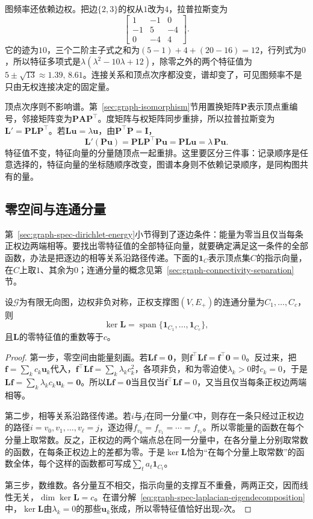 图频率还依赖边权。把边$\{2,3\}$的权从$1$改为$4$，拉普拉斯变为
\[
 \begin{bmatrix}1&-1&0\\-1&5&-4\\0&-4&4\end{bmatrix}.
\]
它的迹为$10$，三个二阶主子式之和为$(5-1)+4+(20-16)=12$，行列式为$0$，所以特征多项式是$\lambda(\lambda^2-10\lambda+12)$，除零之外的两个特征值为$5\pm\sqrt{13}\approx1.39,\,8.61$。连接关系和顶点次序都没变，谱却变了，可见图频率不是只由无权连接决定的固定量。

顶点次序则不影响谱。第~\ref{sec:graph-isomorphism}节用置换矩阵$\bm P$表示顶点重编号，邻接矩阵变为$\bm P\bm A\bm P^{\top}$。度矩阵与权矩阵同步重排，所以拉普拉斯变为$\bm L'=\bm P\bm L\bm P^{\top}$。若$\bm L\bm u=\lambda\bm u$，由$\bm P^{\top}\bm P=\bm I$，
\[
 \bm L'(\bm P\bm u)=\bm P\bm L\bm P^{\top}\bm P\bm u=\bm P\bm L\bm u=\lambda\,\bm P\bm u .
\]
特征值不变，特征向量的分量随顶点一起重排。这里要区分三件事：记录顺序是任意选择的，特征向量的坐标随顺序改变，图谱本身则不依赖记录顺序，是同构图共有的量。

\subsection{零空间与连通分量}
\label{sec:graph-spec-null-space-components}

第~\ref{sec:graph-spec-dirichlet-energy}小节得到了逐边条件：能量为零当且仅当每条正权边两端相等。要找出零特征值的全部特征向量，就要确定满足这一条件的全部函数，办法是把逐边的相等关系沿路径传递。下面的$\bm1_C$表示顶点集$C$的指示向量，在$C$上取$1$、其余为$0$；连通分量的概念见第~\ref{sec:graph-connectivity-separation}节。

\begin{theorem}[零空间与正权支撑分量]
\label{thm:graph-spec-null-space}
设$\mathcal G$为有限无向图，边权非负对称，正权支撑图$(V,E_+)$的连通分量为$C_1,\ldots,C_c$，则
\[
 \ker\bm L=\operatorname{span}\{\bm1_{C_1},\ldots,\bm1_{C_c}\},
\]
且$\bm L$的零特征值的重数等于$c$。
\end{theorem}

\begin{proof}
第一步，零空间由能量刻画。若$\bm L\bm f=\bm0$，则$\bm f^{\top}\bm L\bm f=\bm f^{\top}\bm0=0$。反过来，把$\bm f=\sum_kc_k\bm u_k$代入，$\bm f^{\top}\bm L\bm f=\sum_k\lambda_kc_k^2$，各项非负，和为零迫使$\lambda_k>0$时$c_k=0$，于是$\bm L\bm f=\sum_k\lambda_kc_k\bm u_k=\bm0$。所以$\bm L\bm f=\bm0$当且仅当$\bm f^{\top}\bm L\bm f=0$，又当且仅当每条正权边两端相等。

第二步，相等关系沿路径传递。若$i$与$j$在同一分量$C$中，则存在一条只经过正权边的路径$i=v_0,v_1,\ldots,v_\ell=j$，逐边得$f_{v_0}=f_{v_1}=\cdots=f_{v_\ell}$。所以零能量的函数在每个分量上取常数。反之，正权边的两个端点总在同一分量中，在各分量上分别取常数的函数，在每条正权边上的差都为零。于是$\ker\bm L$恰为“在每个分量上取常数”的函数全体，每个这样的函数都可写成$\sum_ta_t\bm1_{C_t}$。

第三步，数维数。各分量互不相交，指示向量的支撑互不重叠，两两正交，因而线性无关，$\dim\ker\bm L=c$。在谱分解~\eqref{eq:graph-spec-laplacian-eigendecomposition}中，$\ker\bm L$由$\lambda_k=0$的那些$\bm u_k$张成，所以零特征值恰好出现$c$次。
\end{proof}


